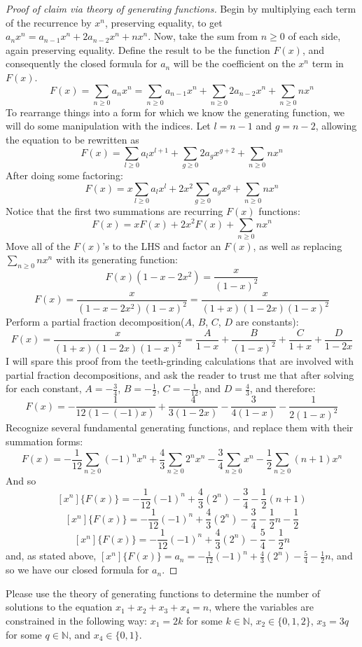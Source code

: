 \documentclass[12pt]{article}
\newenvironment{problem}[2][Problem]{\begin{trivlist}
\item[\hskip \labelsep {\bfseries #1}\hskip \labelsep {\bfseries #2.}]}{\end{trivlist}}
\begin{document}
\begin{proof}[Proof of claim via theory of generating functions]
Begin by multiplying each term of the recurrence by $x^n$, preserving equality, to get $a_nx^n=a_{n-1}x^n+2a_{n-2}x^n+nx^n$. Now, take the sum from $n \geq 0$ of each side, again preserving equality. Define the result to be the function $F(x)$, and consequently the closed formula for $a_n$ will be the coefficient on the $x^n$ term in $F(x)$.
\[F(x)=\sum_{n \geq 0}a_nx^n=\sum_{n \geq 0}a_{n-1}x^n+\sum_{n \geq 0}2a_{n-2}x^n+\sum_{n \geq 0}nx^n\]
To rearrange things into a form for which we know the generating function, we will do some manipulation with the indices. Let $l=n-1$ and $g=n-2$, allowing the equation to be rewritten as
\[F(x)=\sum_{l \geq 0}a_{l}x^{l+1}+\sum_{g \geq 0}2a_{g}x^{g+2}+\sum_{n \geq 0}nx^n\]
After doing some factoring:
\[F(x)=x\sum_{l\geq 0}a_lx^l+2x^2\sum_{g \geq 0}a_gx^g+\sum_{n \geq 0}nx^n\]
Notice that the first two summations are recurring $F(x)$ functions:
\[F(x)=xF(x)+2x^2F(x)+\sum_{n \geq 0}nx^n\]
Move all of the $F(x)$'s to the LHS and factor an $F(x)$, as well as replacing $\sum_{n \geq 0}nx^n$ with its generating function:
\[F(x)(1-x-2x^2)=\frac{x}{(1-x)^2}\]
\[F(x)=\frac{x}{(1-x-2x^2)(1-x)^2}=\frac{x}{(1+x)(1-2x)(1-x)^2}\]
Perform a partial fraction decomposition($A$, $B$, $C$, $D$ are constants):
\[F(x)=\frac{x}{(1+x)(1-2x)(1-x)^2}=\frac{A}{1-x}+\frac{B}{(1-x)^2}+\frac{C}{1+x}+\frac{D}{1-2x}\]
I will spare this proof from the teeth-grinding calculations that are involved with partial fraction decompositions, and ask the reader to trust me that after solving for each constant, $A=-\frac{3}{4}$, $B=-\frac{1}{2}$, $C=-\frac{1}{12}$, and $D=\frac{4}{3}$, and therefore:
\[F(x)=-\frac{1}{12(1-(-1)x)}+\frac{4}{3(1-2x)}-\frac{3}{4(1-x)}-\frac{1}{2(1-x)^2}\]
Recognize several fundamental generating functions, and replace them with their summation forms:
\[F(x)=-\frac{1}{12}\sum_{n \geq 0}(-1)^nx^n+\frac{4}{3}\sum_{n \geq 0}2^nx^n-\frac{3}{4}\sum_{n \geq 0}x^n-\frac{1}{2}\sum_{n \geq 0}(n+1)x^n\]
And so
\[[x^n]\{F(x)\}=-\frac{1}{12}(-1)^n+\frac{4}{3}(2^n)-\frac{3}{4}-\frac{1}{2}(n+1)\]
\[[x^n]\{F(x)\}=-\frac{1}{12}(-1)^n+\frac{4}{3}(2^n)-\frac{3}{4}-\frac{1}{2}n - \frac{1}{2}\]
\[[x^n]\{F(x)\}=-\frac{1}{12}(-1)^n+\frac{4}{3}(2^n)-\frac{5}{4}-\frac{1}{2}n\]
and, as stated above, $[x^n]\{F(x)\}=a_n=-\frac{1}{12}(-1)^n+\frac{4}{3}(2^n)-\frac{5}{4}-\frac{1}{2}n$, and so we have our closed formula for $a_n$.
\end{proof}

\begin{problem}{2}
Please use the theory of generating functions to determine the number of solutions to the equation $x_1+x_2+x_3+x_4=n$, where the variables are constrained in the following way: $x_1=2k$ for some $k \in\mathbb{N}$, $x_2 \in \{0,1,2\}$, $x_3 = 3q$ for some $q\in\mathbb{N}$, and $x_4\in \{0,1\}$.
\end{problem}
  
\end{document}
